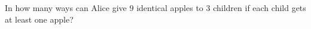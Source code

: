 In how many ways can Alice give $9$ identical apples to $3$ children if each child gets at least one apple?
